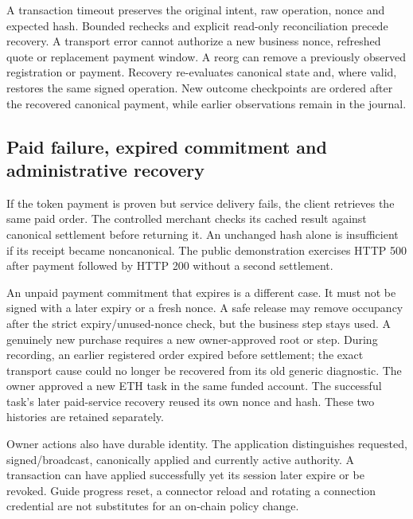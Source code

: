 A transaction timeout preserves the original intent, raw operation, nonce and expected hash. Bounded rechecks and explicit read-only reconciliation precede recovery. A transport error cannot authorize a new business nonce, refreshed quote or replacement payment window. A reorg can remove a previously observed registration or payment. Recovery re-evaluates canonical state and, where valid, restores the same signed operation. New outcome checkpoints are ordered after the recovered canonical payment, while earlier observations remain in the journal.

\subsection{Paid failure, expired commitment and administrative recovery}

If the token payment is proven but service delivery fails, the client retrieves the same paid order. The controlled merchant checks its cached result against canonical settlement before returning it. An unchanged hash alone is insufficient if its receipt became noncanonical. The public demonstration exercises HTTP 500 after payment followed by HTTP 200 without a second settlement.

An unpaid payment commitment that expires is a different case. It must not be signed with a later expiry or a fresh nonce. A safe release may remove occupancy after the strict expiry/unused-nonce check, but the business step stays used. A genuinely new purchase requires a new owner-approved root or step. During recording, an earlier registered order expired before settlement; the exact transport cause could no longer be recovered from its old generic diagnostic. The owner approved a new ETH task in the same funded account. The successful task's later paid-service recovery reused its own nonce and hash. These two histories are retained separately.\citep{case}

Owner actions also have durable identity. The application distinguishes requested, signed/broadcast, canonically applied and currently active authority. A transaction can have applied successfully yet its session later expire or be revoked. Guide progress reset, a connector reload and rotating a connection credential are not substitutes for an on-chain policy change.
